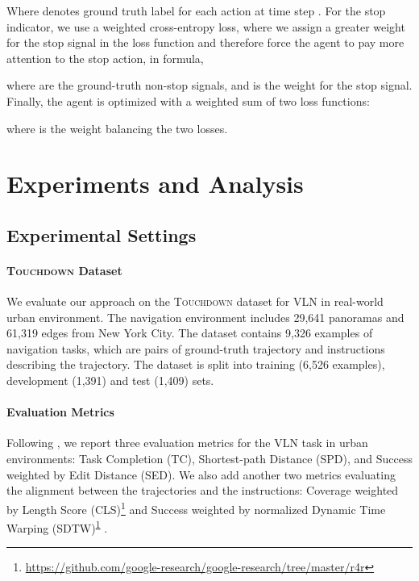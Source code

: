 \documentclass[11pt,a4paper]{article}
\begin{document}
Where  denotes ground truth label for each action at time step .
For the stop indicator, we use a weighted cross-entropy loss, where we assign a greater weight for the stop signal in the loss function and therefore force the agent to pay more attention to the stop action, in formula,

where  are the ground-truth non-stop signals, and  is the weight for the stop signal. Finally, the agent is optimized with a weighted sum of two loss functions:

where  is the weight balancing the two losses.

\section{Experiments and Analysis}
\label{experiments}
\subsection{Experimental Settings}
\paragraph{\textsc{Touchdown} Dataset}
We evaluate our approach on the \textsc{Touchdown} dataset \citep{chen2019touchdown} for VLN in real-world urban environment. The navigation environment includes 29,641 panoramas and 61,319 edges from New York City. The dataset contains 9,326 examples of navigation tasks, which are pairs of ground-truth trajectory and instructions describing the trajectory. The dataset is split into training (6,526 examples), development (1,391) and test (1,409) sets.

\paragraph{Evaluation Metrics}
Following \citet{chen2019touchdown}, we report three evaluation metrics for the VLN task in urban environments: Task Completion (TC), Shortest-path Distance (SPD), and Success weighted by Edit Distance (SED). We also add another two metrics evaluating the alignment between the trajectories and the instructions: Coverage weighted by Length Score (CLS)\footnote{\url{https://github.com/google-research/google-research/tree/master/r4r}\label{metrics}} \cite{jain2019stay} and Success weighted by
normalized Dynamic Time Warping (SDTW)\textsuperscript{\ref{metrics}} \cite{magalhaes2019effective}.
\end{document}
